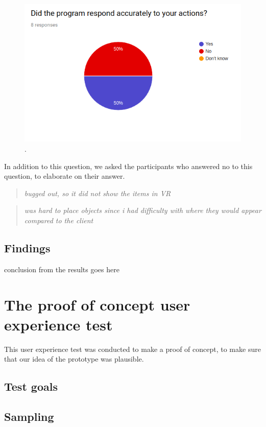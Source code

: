\begin{figure}[H]
	\centering
	\includegraphics[width=0.9\linewidth]{figure/Evaluation/pie3.png}
	\caption{.}
	\label{fig:pie3}
\end{figure}

In addition to this question, we asked the participants who answered no to this question, to elaborate on their answer.

\begin{quote}
	\textit{ bugged out, so it did not show the items in VR}
\end{quote}

\begin{quote}
	\textit{was hard to place objects since i had difficulty with where they would appear compared to the client}
\end{quote}


\subsection{Findings}
conclusion from the results goes here

\section{The proof of concept user experience test}
This user experience test was conducted to make a proof of concept, to make sure that our idea of the prototype was plausible.

\subsection{Test goals}


\subsection{Sampling}

